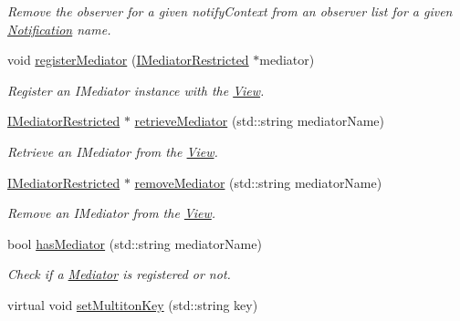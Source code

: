 \begin{DoxyCompactItemize}
\begin{DoxyCompactList}\small\item\em Remove the observer for a given notifyContext from an observer list for a given \hyperlink{class_pure_m_v_c_1_1_notification}{Notification} name. \item\end{DoxyCompactList}\item 
void \hyperlink{class_pure_m_v_c_1_1_view_a6980c6deed6fff89a94c8cb09df7a644}{registerMediator} (\hyperlink{class_pure_m_v_c_1_1_i_mediator_restricted}{IMediatorRestricted} $\ast$mediator)
\begin{DoxyCompactList}\small\item\em Register an {\ttfamily IMediator} instance with the {\ttfamily \hyperlink{class_pure_m_v_c_1_1_view}{View}}. \item\end{DoxyCompactList}\item 
\hyperlink{class_pure_m_v_c_1_1_i_mediator_restricted}{IMediatorRestricted} $\ast$ \hyperlink{class_pure_m_v_c_1_1_view_a108934f0fe48f40f715a0f310d40a26e}{retrieveMediator} (std::string mediatorName)
\begin{DoxyCompactList}\small\item\em Retrieve an {\ttfamily IMediator} from the {\ttfamily \hyperlink{class_pure_m_v_c_1_1_view}{View}}. \item\end{DoxyCompactList}\item 
\hyperlink{class_pure_m_v_c_1_1_i_mediator_restricted}{IMediatorRestricted} $\ast$ \hyperlink{class_pure_m_v_c_1_1_view_a015fe15ee362685fdb72584019417b5d}{removeMediator} (std::string mediatorName)
\begin{DoxyCompactList}\small\item\em Remove an {\ttfamily IMediator} from the {\ttfamily \hyperlink{class_pure_m_v_c_1_1_view}{View}}. \item\end{DoxyCompactList}\item 
bool \hyperlink{class_pure_m_v_c_1_1_view_a5af9aeea286647436cf595d0a946711f}{hasMediator} (std::string mediatorName)
\begin{DoxyCompactList}\small\item\em Check if a \hyperlink{class_pure_m_v_c_1_1_mediator}{Mediator} is registered or not. \item\end{DoxyCompactList}\item 
virtual void \hyperlink{class_pure_m_v_c_1_1_multiton_key_heir_abc70ef7c066bc8d7bf0196ec727599bb}{setMultitonKey} (std::string key)

\end{DoxyCompactItemize}
